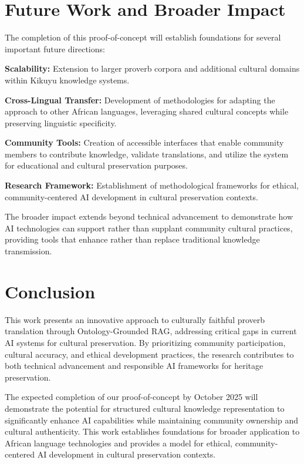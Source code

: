 \documentclass[
]{ceurart}
\begin{document}
\section{Future Work and Broader Impact}

The completion of this proof-of-concept will establish foundations for several important future directions:

\textbf{Scalability:} Extension to larger proverb corpora and additional cultural domains within Kikuyu knowledge systems.

\textbf{Cross-Lingual Transfer:} Development of methodologies for adapting the approach to other African languages, leveraging shared cultural concepts while preserving linguistic specificity.

\textbf{Community Tools:} Creation of accessible interfaces that enable community members to contribute knowledge, validate translations, and utilize the system for educational and cultural preservation purposes.

\textbf{Research Framework:} Establishment of methodological frameworks for ethical, community-centered AI development in cultural preservation contexts.

The broader impact extends beyond technical advancement to demonstrate how AI technologies can support rather than supplant community cultural practices, providing tools that enhance rather than replace traditional knowledge transmission.

\section{Conclusion}

This work presents an innovative approach to culturally faithful proverb translation through Ontology-Grounded RAG, addressing critical gaps in current AI systems for cultural preservation. By prioritizing community participation, cultural accuracy, and ethical development practices, the research contributes to both technical advancement and responsible AI frameworks for heritage preservation.

The expected completion of our proof-of-concept by October 2025 will demonstrate the potential for structured cultural knowledge representation to significantly enhance AI capabilities while maintaining community ownership and cultural authenticity. This work establishes foundations for broader application to African language technologies and provides a model for ethical, community-centered AI development in cultural preservation contexts.
\end{document}
